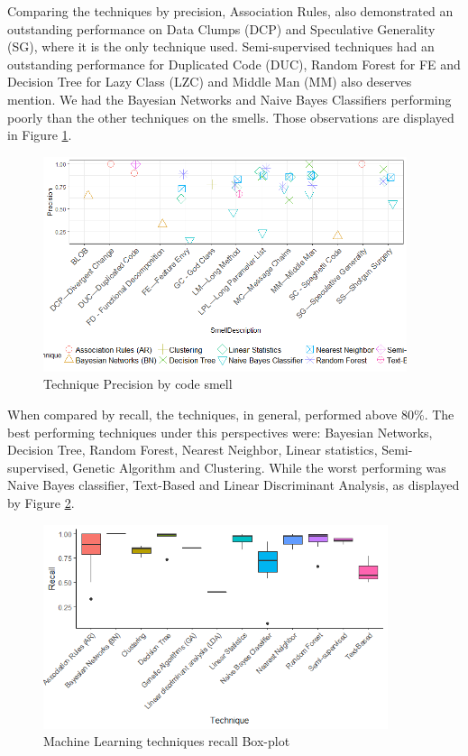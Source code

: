 Comparing the techniques by precision, Association Rules, also demonstrated an outstanding performance on Data Clumps (DCP) and Speculative Generality (SG), where it is the only technique used. Semi-supervised techniques had an outstanding performance for Duplicated Code (DUC), Random Forest for FE and Decision Tree for Lazy Class (LZC) and Middle Man (MM) also deserves mention. We had the Bayesian Networks and Naive Bayes Classifiers performing poorly than the other techniques on the smells. Those observations are displayed in Figure \ref{fig:techniqueXSmellPrecision}.

\begin{figure}[!ht] 
    \centering
	\caption{Technique Precision by code smell}
	\label{fig:techniqueXSmellPrecision}
	\includegraphics[width=0.95\textwidth]{imagens/TechniqueXSmellPrecision.png}
\end{figure}

When compared by recall, the techniques, in general, performed above 80\%. The best performing techniques under this perspectives were: Bayesian Networks, Decision Tree, Random Forest, Nearest Neighbor, Linear statistics, Semi-supervised, Genetic Algorithm and Clustering. While the worst performing was Naive Bayes classifier, Text-Based and Linear Discriminant Analysis, as displayed by Figure \ref{fig:recallByTechnique}.

\begin{figure}[!ht] 
    \centering
	\caption{Machine Learning techniques recall Box-plot}
	\label{fig:recallByTechnique}
	\includegraphics[width=0.9\textwidth]{imagens/recallByTechnique.png}
\end{figure}

